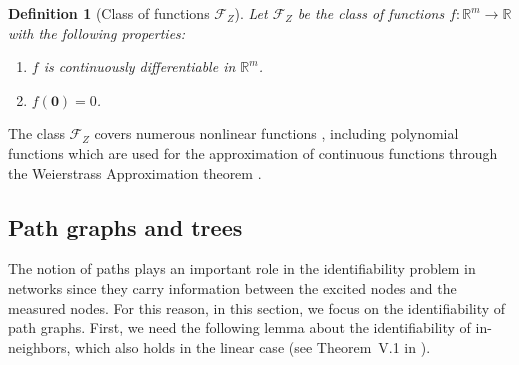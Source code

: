 \documentclass[letterpaper,10pt,journal]{IEEEtran}
\newcommand{\Fone}{\mathcal{F}_Z}
\newtheorem{definition}{Definition}
\newcommand{\R}{\mathbb R}
\newcommand{\zero}{\mathbf{0}}
\begin{document}
\begin{definition}[Class of functions $\Fone$]
Let $\Fone$ be the class of functions $f:\R^m\to\R$ with the following properties:
\begin{enumerate}
    \item $f$ is continuously differentiable in $\R^m$.
    \item $f(\zero)=0$.
\end{enumerate}
\end{definition}
The class $\Fone$ covers numerous nonlinear
functions \cite{abramowitz1965handbook}, including polynomial functions which are used for the approximation of continuous functions through the Weierstrass Approximation theorem \cite{llavona1986approximation}.
    
\subsection{Path graphs and trees}\label{sec:paths_trees}

The notion of paths plays an important role in the identifiability problem in networks since they carry information between the excited nodes and the measured nodes. For this reason, in this section, we focus on the identifiability of path graphs. First, we need the following lemma about the identifiability of in-neighbors, which also holds in the linear case (see Theorem~V.1 in \cite{hendrickx2019identifiability}).
\end{document}
